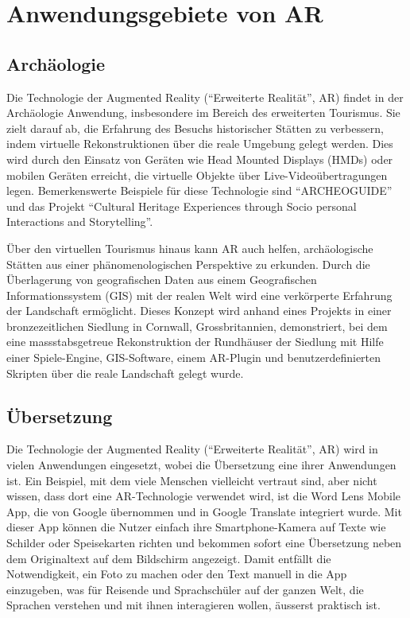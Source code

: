 \section{Anwendungsgebiete von AR}

\subsection{Archäologie}

Die Technologie der Augmented Reality (“Erweiterte Realität”, AR) findet in der Archäologie Anwendung, insbesondere im Bereich des erweiterten Tourismus. Sie zielt darauf ab, die Erfahrung des Besuchs historischer Stätten zu verbessern, indem virtuelle Rekonstruktionen über die reale Umgebung gelegt werden. Dies wird durch den Einsatz von Geräten wie Head Mounted Displays (HMDs) oder mobilen Geräten erreicht, die virtuelle Objekte über Live-Videoübertragungen legen. Bemerkenswerte Beispiele für diese Technologie sind “ARCHEOGUIDE” und das Projekt “Cultural Heritage Experiences through Socio personal Interactions and Storytelling”.

Über den virtuellen Tourismus hinaus kann AR auch helfen, archäologische Stätten aus einer phänomenologischen Perspektive zu erkunden. Durch die Überlagerung von geografischen Daten aus einem Geografischen Informationssystem (GIS) mit der realen Welt wird eine verkörperte Erfahrung der Landschaft ermöglicht. Dieses Konzept wird anhand eines Projekts in einer bronzezeitlichen Siedlung in Cornwall, Grossbritannien, demonstriert, bei dem eine massstabsgetreue Rekonstruktion der Rundhäuser der Siedlung mit Hilfe einer Spiele-Engine, GIS-Software, einem AR-Plugin und benutzerdefinierten Skripten über die reale Landschaft gelegt wurde. 
\cite{Archaeology}

\subsection{Übersetzung}

Die Technologie der Augmented Reality (“Erweiterte Realität”, AR) wird in vielen Anwendungen eingesetzt, wobei die Übersetzung eine ihrer Anwendungen ist. Ein Beispiel, mit dem viele Menschen vielleicht vertraut sind, aber nicht wissen, dass dort eine AR-Technologie verwendet wird, ist die Word Lens Mobile App, die von Google übernommen und in Google Translate integriert wurde. Mit dieser App können die Nutzer einfach ihre Smartphone-Kamera auf Texte wie Schilder oder Speisekarten richten und bekommen sofort eine Übersetzung neben dem Originaltext auf dem Bildschirm angezeigt. Damit entfällt die Notwendigkeit, ein Foto zu machen oder den Text manuell in die App einzugeben, was für Reisende und Sprachschüler auf der ganzen Welt, die Sprachen verstehen und mit ihnen interagieren wollen, äusserst praktisch ist. \cite{QuestVisual_2010}


